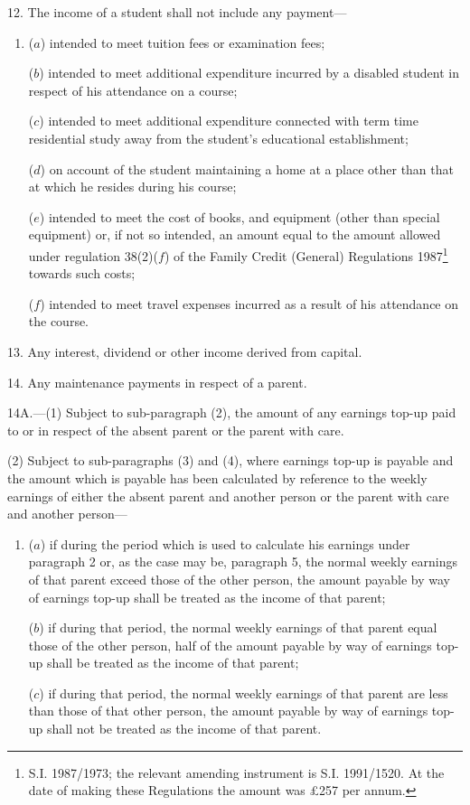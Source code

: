 \documentclass[12pt,a4paper]{article}
\begin{document}
\medskip

12.  The income of a student shall not include any payment—
\begin{enumerate}\item[]
($a$) intended to meet tuition fees or examination fees;

($b$) intended to meet additional expenditure incurred by a disabled student in respect of his attendance on a course;

($c$) intended to meet additional expenditure connected with term time residential study away from the student’s educational establishment;

($d$) on account of the student maintaining a home at a place other than that at which he resides during his course;

($e$) intended to meet the cost of books, and equipment (other than special equipment) or, if not so intended, an amount equal to the amount allowed under regulation 38(2)($f$) of the Family Credit (General) Regulations 1987\footnote{\frenchspacing S.I. 1987/1973; the relevant amending instrument is S.I. 1991/1520. At the date of making these Regulations the amount was £257 per annum.} towards such costs;

($f$) intended to meet travel expenses incurred as a result of his attendance on the course.
\end{enumerate}

\medskip

13.  Any interest, dividend or other income derived from capital.

\medskip

14.  Any maintenance payments in respect of a parent.

\medskip

14A.—(1) Subject to sub-paragraph (2), the amount of any earnings top-up paid to or in respect of the absent parent or the parent with care.

(2) Subject to sub-paragraphs (3) and (4), where earnings top-up is payable and the amount which is payable has been calculated by reference to the weekly earnings of either the absent parent and another person or the parent with care and another person—
\begin{enumerate}\item[]
($a$) if during the period which is used to calculate his earnings under paragraph 2 or, as the case may be, paragraph 5, the normal weekly earnings of that parent exceed those of the other person, the amount payable by way of earnings top-up shall be treated as the income of that parent;

($b$) if during that period, the normal weekly earnings of that parent equal those of the other person, half of the amount payable by way of earnings top-up shall be treated as the income of that parent;

($c$) if during that period, the normal weekly earnings of that parent are less than those of that other person, the amount payable by way of earnings top-up shall not be treated as the income of that parent.
\end{enumerate}
\end{document}
